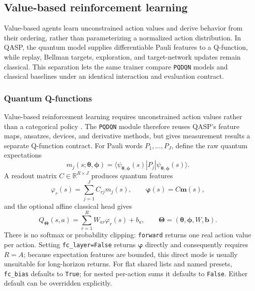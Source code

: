 \documentclass[10pt]{article}
\newcommand{\code}[1]{\texttt{#1}}
\newcommand{\R}{\mathbb{R}}
\begin{document}
\subsection{Value-based reinforcement learning}
\label{sec:rl-value-based}

Value-based agents learn unconstrained action values and derive behavior from
their ordering, rather than parameterizing a normalized action distribution.
In QASP, the quantum model supplies differentiable Pauli features to a
Q-function, while replay, Bellman targets, exploration, and target-network
updates remain classical.  This separation lets the same trainer compare
\code{PQDQN} models and classical baselines under an identical interaction
and evaluation contract.

\subsubsection{Quantum Q-functions}
\label{sec:pqdqn}

Value-based reinforcement learning requires unconstrained action values rather
than a categorical policy \cite{mnih2015human,hasselt2016deep}.  The
\code{PQDQN} module therefore reuses QASP's
feature maps, ansatzes, devices, and derivative methods, but gives measurement
results a separate Q-function contract.  For Pauli words
$P_1,\ldots,P_J$, define the raw quantum expectations
\begin{equation}
  m_j(s;\bm\theta,\bm\phi)
  =\langle\psi_{\bm\theta,\bm\phi}(s)|P_j|
    \psi_{\bm\theta,\bm\phi}(s)\rangle .
  \label{eq:pqdqn-raw-expectations}
\end{equation}
A readout matrix $C\in\R^{R\times J}$ produces quantum features
\begin{equation}
  \varphi_r(s)=\sum_{j=1}^{J}C_{rj}m_j(s),
  \qquad \bm\varphi(s)=C\bm m(s),
  \label{eq:pqdqn-fixed-readout}
\end{equation}
and the optional affine classical head gives
\begin{equation}
  Q_{\bm\Theta}(s,a)
  =\sum_{r=1}^{R}W_{ar}\varphi_r(s)+b_a,
  \qquad \bm\Theta=(\bm\theta,\bm\phi,W,\bm b).
  \label{eq:pqdqn-q-values}
\end{equation}
There is no softmax or probability clipping: \code{forward} returns one real
action value per action.  Setting \code{fc\_layer=False} returns
$\bm\varphi$ directly and consequently requires $R=A$; because expectation
features are bounded, this direct mode is usually unsuitable for long-horizon
returns.  For flat shared lists and named presets, \code{fc\_bias} defaults to
\code{True}; for nested per-action sums it defaults to \code{False}.  Either
default can be overridden explicitly.
\end{document}
